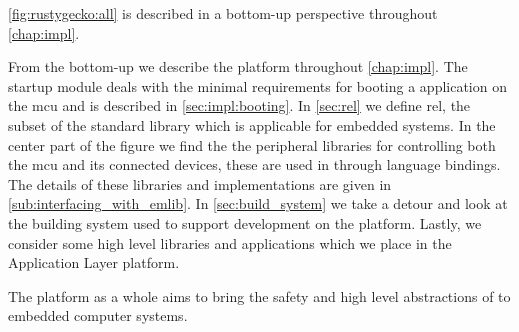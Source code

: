 \autoref{fig:rustygecko:all} is described in a bottom-up perspective throughout \autoref{chap:impl}.

From the bottom-up we describe the platform throughout \autoref{chap:impl}.
The startup module deals with the minimal requirements for booting a {\rust} application on the \gls{mcu} and is described in \autoref{sec:impl:booting}.
In \autoref{sec:rel} we define \gls{rel}, the subset of the standard library which is applicable for embedded systems.
In the center part of the figure we find the the peripheral libraries for controlling both the \gls{mcu} and its connected devices, these are used in {\rust} through language bindings.
The details of these libraries and implementations are given in \autoref{sub:interfacing_with_emlib}.
In \autoref{sec:build_system} we take a detour and look at the building system used to support development on the {\rg} platform.
Lastly, we consider some high level libraries and applications which we place in the Application Layer platform.

The {\rg} platform as a whole aims to bring the safety and high level abstractions of {\rust} to embedded computer systems.
